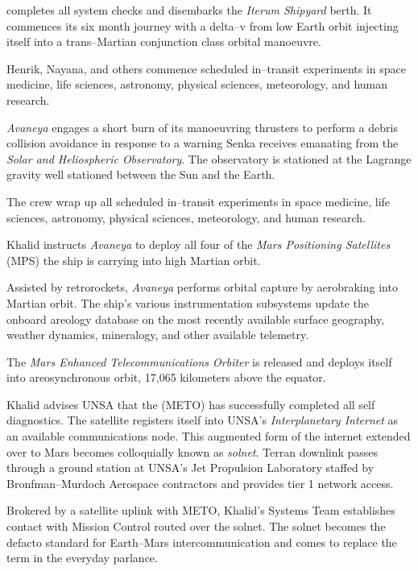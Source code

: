  completes all system checks and disembarks the {\it Iterum Shipyard} berth. It commences its six month journey with a delta--v from low Earth orbit injecting itself into a trans--Martian conjunction class orbital manoeuvre.
\StopTimelineDate

Henrik, Nayana, and others commence scheduled in--transit experiments in space medicine, life sciences, astronomy, physical sciences, meteorology, and human research.
\StopTimelineDate

{\it Avaneya} engages a short burn of its manoeuvring thrusters to perform a debris collision avoidance in response to a warning Senka receives emanating from the {\it Solar and Heliospheric Observatory}. The observatory is stationed at the Lagrange  gravity well stationed between the Sun and the Earth.
\StopTimelineDate

The crew wrap up all scheduled in--transit experiments in space medicine, life sciences, astronomy, physical sciences, meteorology, and human research.
\StopTimelineDate

Khalid instructs {\it Avaneya} to deploy all four of the {\it Mars Positioning Satellites} (MPS) the ship is carrying into high Martian orbit.
\StopTimelineDate

Assisted by retrorockets, {\it Avaneya} performs orbital capture by aerobraking into Martian orbit. The ship's various instrumentation subsystems update the onboard areology database on the most recently available surface geography, weather dynamics, mineralogy, and other available telemetry.

The {\it Mars Enhanced Telecommunications Orbiter} is released and deploys itself into areosynchronous orbit, 17,065 kilometers above the equator.

Khalid advises UNSA that the  (METO) has successfully completed all self diagnostics. The satellite registers itself into UNSA's {\it Interplanetary Internet} as an available communications node. This augmented form of the internet extended over to Mars becomes colloquially known as {\it solnet}. Terran downlink passes through a ground station at UNSA's Jet Propulsion Laboratory staffed by Bronfman--Murdoch Aerospace contractors and provides tier 1 network access.

Brokered by a satellite uplink with METO, Khalid's Systems Team establishes contact with Mission Control routed over the solnet. The solnet becomes the defacto standard for Earth--Mars intercommunication and comes to replace the term  in the everyday parlance.
\StopTimelineDate

